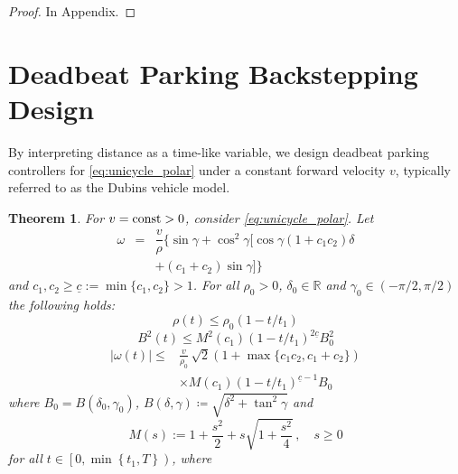 \documentclass[letterpaper, 10 pt, conference]{ieeeconf}  %
\newtheorem{theorem}{Theorem}
\begin{document}
\begin{proof}
In Appendix.
\end{proof}

\section{Deadbeat Parking Backstepping Design}

By interpreting distance as a time-like variable, we design deadbeat parking controllers for \eqref{eq:unicycle_polar} under a constant forward velocity $v$, typically referred to as the Dubins vehicle model.

\begin{theorem}%
\label{thm:Dubins-FT-stabilize}
For $v=\mbox{\rm const}>0$,  consider \eqref{eq:unicycle_polar}. 
Let
\begin{eqnarray}\label{eq-control-omega}
\omega &=& \dfrac{v}{\rho}\bigl\{
\sin\gamma +\cos^2\gamma\bigl[\cos\gamma
(1+c_1c_2)\delta\nonumber \\
&&+(c_1+c_2)\sin\gamma
\bigr]\bigr\}
\end{eqnarray}
and $c_1,c_2 \geq \underline c :=\min\{c_1,c_2\} >1$. For all $\rho_0>0$, $\delta_0\in\mathbb{R}$ and $\gamma_0\in(-\pi/2,\pi/2)$ the following holds:
\begin{equation}
\label{eq-rho-bound}
\rho(t)\leq \rho_0(1-t/t_1)
\end{equation}
\begin{equation}
\label{eq-deltan-bound}
B^2(t) \leq M^2(c_1)\left( 1- 
t/t_1
\right)^{2\underline c}B^2_0
\end{equation}
\begin{align}
\label{eq-omega(t)-bound}
|\omega(t)| \leq & \frac{v}{\rho_0} \,
\sqrt{2}(1+\max\{c_1c_2,c_1+c_2\})\nonumber\\
&\times M(c_1)\left( 1- t/t_1
\right)^{\underline c -1}B_0
\end{align}
where $B_0 = B(\delta_0,\gamma_0)$, $B(\delta,\gamma) \coloneqq \sqrt{\delta^2 + \tan^2\gamma}$ and
\begin{equation}
M(s) := 
1+\frac{s^2}{2}  + s\sqrt{1+\frac{s^2}{4} }\,, \quad s\geq 0
\label{eq:M}
\end{equation}
for all $t\in\left[0, \min\left\{t_1,T\right\} \right)$, where 
\begin{equation}

\end{equation}
\end{theorem}
\end{document}
